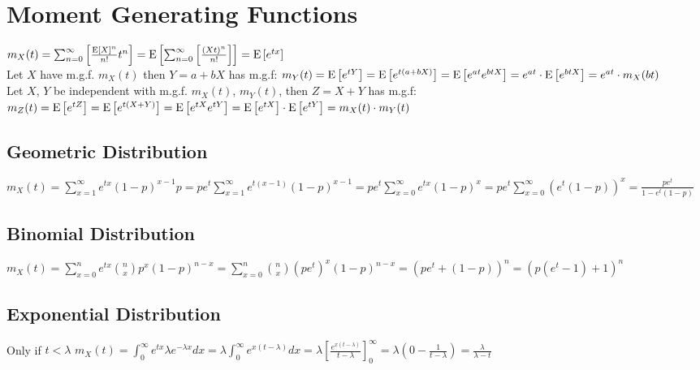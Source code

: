 \section{Moment Generating Functions}
\begin{math}
  m_X(t) = \sum_{n = 0}^{\infty} \left[ \frac{\mathrm{E} \left[ {X} \right]^n}{n!}t^n \right]
         = \mathrm{E} \left[ {\sum_{n = 0}^{\infty} \left[ \frac{(Xt)^n}{n!} \right]} \right]
         = \mathrm{E} \left[ {e^{tx}} \right]
\end{math} \\[6pt]
Let \(X\) have m.g.f. \(m_X(t)\) then \(Y = a + bX\) has m.g.f:
\begin{math}
  m_Y(t) = \mathrm{E} \left[ {e^{tY}} \right]
         = \mathrm{E} \left[ {e^{t(a + bX)}} \right]
         = \mathrm{E} \left[ {e^{at} e^{btX}} \right]
         = e^{at} \cdot \mathrm{E} \left[ {e^{btX}} \right]
         = e^{at} \cdot m_X(bt)
\end{math} \\[6pt]
Let \(X\), \(Y\) be independent with m.g.f. \(m_X(t)\), \(m_Y(t)\), then \(Z = X + Y\) has m.g.f:
\begin{math}
  m_Z(t) = \mathrm{E} \left[ {e^{tZ}} \right]
         = \mathrm{E} \left[ {e^{t(X + Y)}} \right]
         = \mathrm{E} \left[ {e^{tX} e^{tY}} \right]
         = \mathrm{E} \left[ {e^{tX}} \right] \cdot \mathrm{E} \left[ {e^{tY}} \right]
         = m_X(t) \cdot m_Y(t)
\end{math} \\[2pt]

\subsection{Geometric Distribution}
\begin{math}
  m_X(t) = \sum_{x = 1}^{\infty} e^{tx} (1 - p)^{x - 1}p
         = pe^t \sum_{x = 1}^{\infty}{e^{t(x - 1)}(1 - p)^{x - 1}}
         = pe^t \sum_{x = 0}^{\infty}{e^{tx}(1 - p)^x}
         = pe^t \sum_{x = 0}^{\infty}{(e^t(1 - p))^x}
         = \frac{pe^t}{1 - e^t(1 - p)}
\end{math} \\[2pt]

\subsection{Binomial Distribution}
\begin{math}
  m_X(t) = \sum_{x=0}^n{e^{tx}\binom{n}{x}p^x(1-p)^{n-x}}
         = \sum_{x=0}^n{\binom{n}{x}(pe^t)^x(1-p)^{n-x}}
         = (pe^t + (1 - p))^n = (p(e^t-1)+1)^n
\end{math} \\[2pt]

\subsection{Exponential Distribution}
Only if \(t < \lambda\)
\begin{math}
  m_X(t) = \int_0^{\infty}{e^{tx} \lambda e^{-\lambda x}dx}
         = \lambda \int_0^{\infty}{e^{x(t-\lambda)}dx}
         = \lambda \left[\frac{e^{x(t-\lambda)}}{t-\lambda}\right]_0^{\infty}
         = \lambda \left(0-\frac{1}{t-\lambda}\right)
         = \frac{\lambda}{\lambda - t}
\end{math} \\[2pt]

